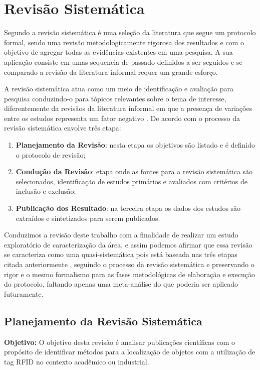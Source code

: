 \section{Revisão Sistemática}
			Segundo \citeauthor{Kitchenham:2009:SLR:1465742.1466091}  a revisão sistemática é uma seleção da literatura que segue um protocolo formal, sendo uma revisão metodologicamente rigorosa dos resultados e com o objetivo de agregar todas as evidências existentes em uma pesquisa. A sua aplicação consiste em umas sequencia de passado definidos a ser seguidos e se comparado a revisão da literatura informal requer um grande esforço.
			
			\par 
			A revisão sistemática atua como um meio de identificação  e avaliação para pesquisa conduzindo-o para tópicos relevantes sobre o tema de interesse, diferentemente da revisãos da literatura informal em que a presença de variações entre os estudos representa um fator negativo
			\cite{MafraTravassos}. 
			De acordo com \citeauthor{MafraTravassos} o processo da revisão sistemática envolve três etapa: 
			\begin{enumerate}
			    \item \textbf{Planejamento da Revisão}: nesta etapa os objetivos são listado e é definido o protocolo de revisão;
			    \item \textbf{Condução da Revisão}: etapa onde as fontes para a revisão sistemática são selecionados, identificação de estudos primários e avaliados com critérios de inclusão e exclusão;
			    \item \textbf{Publicação dos Resultado}: na terceira etapa os dados dos estudos são extraídos e sintetizados para serem publicados.
			\end{enumerate}
			
			\par 
			Conduzimos a revisão deste trabalho com a finalidade de realizar um estudo exploratório de caracterização da área, e assim podemos afirmar que essa revisão se caracteriza como uma quasi-sistemática pois está baseada nas três etapas citada anteriormente \cite{MafraTravassos}, seguindo o processo da revisão sistemática e preservando o rigor e o mesmo formalismo para as fases metodológicas de elaboração e execução do protocolo, faltando apenas uma meta-análise do que poderia ser aplicado futuramente.
			

		\subsection{ Planejamento da Revisão Sistemática}
			\par
\textbf{Objetivo: }O objetivo desta revisão é analisar publicações científicas com o propósito de  identificar métodos para a localização de objetos com a utilização de tag RFID no contexto acadêmico ou industrial.
			
